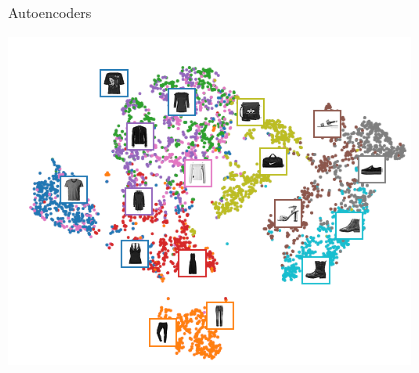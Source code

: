 \documentclass[11pt]{beamer}
\begin{document}
\begin{frame}{Autoencoders \cite{pml1Book}}
\begin{center}
\includegraphics[width=0.8\textwidth]{Pic/autoencoder_ex.png}
\end{center}
\end{frame}
\end{document}
